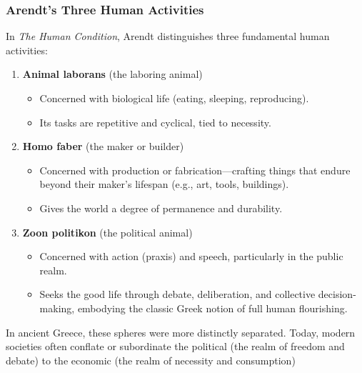                 \subsubsection{Arendt’s Three Human Activities}

                    In \textit{The Human Condition}, Arendt distinguishes three fundamental human activities:
\vspace{-0.05cm}
                        \begin{enumerate}
                            \item \textbf{Animal laborans} (the laboring animal)
                                \begin{itemize}
                                    \item Concerned with biological life (eating, sleeping, reproducing).
                                    \item Its tasks are repetitive and cyclical, tied to necessity.
                                \end{itemize}
                            \item \textbf{Homo faber} (the maker or builder)
                                \begin{itemize}
                                    \item Concerned with production or fabrication—crafting things that endure beyond their maker’s lifespan (e.g., art, tools, buildings).
                                    \item Gives the world a degree of permanence and durability.
                                \end{itemize}
                            \item \textbf{Zoon politikon} (the political animal)
                                \begin{itemize}
                                    \item Concerned with action (praxis) and speech, particularly in the public realm.
                                    \item Seeks the good life through debate, deliberation, and collective decision-making, embodying the classic Greek notion of full human flourishing.
                                \end{itemize}
                        \end{enumerate}

                    \begin{remark}
                        In ancient Greece, these spheres were more distinctly separated. Today, modern societies often conflate or subordinate the political (the realm of freedom and debate) to the economic (the realm of necessity and consumption)
                    \end{remark}


